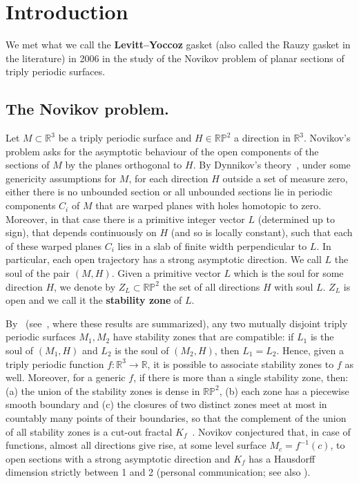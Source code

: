 \documentclass[11pt]{amsart}
\theoremstyle{definition}
\theoremstyle{remark}
\newcommand{\R}{\mathbb R}
\newcommand{\RP}{\mathbb{RP}}
\begin{document}
\maketitle

\section{Introduction}

We met what we call the \textbf{Levitt--Yoccoz} gasket (also called the Rauzy gasket in the literature) in 2006 in the study of the Novikov problem of planar sections of triply periodic surfaces.

\subsection*{The Novikov problem.}
Let $M\subset\R^3$ be a triply periodic surface and $H\in\RP^2$ a direction in $\R^3$.
Novikov's problem asks for the asymptotic behaviour of the open components of the sections of $M$ by the planes orthogonal to $H$. 
By Dynnikov's theory~\cite{Dyn99}, under some genericity assumptions for $M$, for each direction $H$ outside a set of measure zero, either there is no unbounded section or all unbounded sections 
lie in periodic components $C_i$ of $M$ that are warped planes with holes homotopic to zero.
Moreover, in that case there is a primitive integer vector $L$ (determined up to sign), that depends continuously on $H$ (and so is locally constant), such that each of these warped planes $C_i$ lies in a slab of finite width perpendicular to $L$.
In particular, each open trajectory has a strong asymptotic direction.
We call $L$ the soul of the pair $(M,H)$.
Given a primitive vector $L$ which is the soul for some direction $H$, we denote by $Z_L\subset\RP^2$ the set of all directions $H$ with soul $L$.
$Z_L$ is open and we call it the \textbf{stability zone} of $L$.

By~\cite{Dyn99} (see~\cite[Props.~1--3]{DD09}, where these results are summarized), any two mutually disjoint triply periodic surfaces $M_1,M_2$ have stability zones that are compatible: if $L_1$ is the soul of $(M_1,H)$ and $L_2$ is the soul of $(M_2,H)$, then $L_1=L_2$.
Hence, given a triply periodic function $f:\R^3\to\R$, it is possible to associate stability zones to $f$ as well.
Moreover, for a generic $f$, if there is more than a single stability zone, then: (a) the union of the stability zones is dense in $\RP^2$, (b) each zone has a piecewise smooth boundary and (c) the closures of two distinct zones meet at most in countably many points of their boundaries, so that the complement of the union of all stability zones is a cut-out fractal $K_f$~\cite[Prop.~3 and the remark after it]{DD09}.
Novikov conjectured that, in case of functions, almost all directions give rise, at some level surface $M_c=f^{-1}(c)$, to open sections with a strong asymptotic direction and $K_f$ has a Hausdorff dimension strictly between 1 and 2 (personal communication; see also \cite{MN04}).
\end{document}
